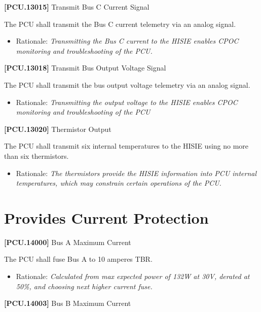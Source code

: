 \textbf{[PCU.13015]} Transmit Bus C Current Signal

The \gls{PCU} shall transmit the Bus C current telemetry via an analog signal.

\begin{itemize}
\item{} Rationale: \emph{Transmitting the Bus C current to the HISIE enables CPOC monitoring and troubleshooting of the PCU.}

\end{itemize}

\textbf{[PCU.13018]} Transmit Bus Output Voltage Signal

The \gls{PCU} shall transmit the bus output voltage telemetry via an analog signal.

\begin{itemize}
\item{} Rationale: \emph{Transmitting the output voltage to the HISIE enables CPOC monitoring and troubleshooting of the PCU}

\end{itemize}

\textbf{[PCU.13020]} Thermistor Output

The \gls{PCU} shall transmit six internal temperatures to the \gls{HISIE} using no more than six thermistors.

\begin{itemize}
\item{} Rationale: \emph{The thermistors provide the HISIE information into PCU internal temperatures, which may constrain certain operations of the PCU.}

\end{itemize}

\section{Provides Current Protection}
\label{providescurrentprotection}

\textbf{[PCU.14000]} Bus A Maximum Current

The \gls{PCU} shall fuse Bus A to 10 amperes TBR\label{tbx_5}.

\begin{itemize}
\item{} Rationale: \emph{Calculated from max expected power of 132W at 30V, derated at 50\%, and choosing next higher current fuse.}

\end{itemize}

\textbf{[PCU.14003]} Bus B Maximum Current

